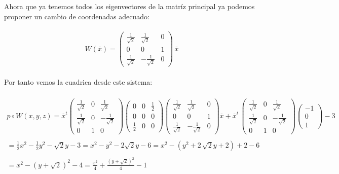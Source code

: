 \documentclass[11pt,letterpaper]{article}
\begin{document}
    Ahora que ya tenemos todos los eigenvectores de la matr\'iz principal ya podemos proponer un cambio de coordenadas adecuado:\,\\
    \,\\
    \begin{equation*}
        W(\overline{x})=
        \begin{pmatrix}
                \frac{1}{\sqrt{2}} & \frac{1}{\sqrt{2}} & 0\\
                0 & 0& 1\\
                 \frac{1}{\sqrt{2}} & -\frac{1}{\sqrt{2}} &0
                \end{pmatrix}\,\overline{x}
    \end{equation*}\,\\
    Por tanto vemos la cuadrica desde este sistema:\,\\
    \,\\
    \begin{align*}
        p\circ W(x,y,z)=\overline{x}^t \begin{pmatrix}
                \frac{1}{\sqrt{2}} & 0& \frac{1}{\sqrt{2}}\\
                \frac{1}{\sqrt{2}} & 0& -\frac{1}{\sqrt{2}}\\
                 0& 1 &0
                \end{pmatrix}
                \begin{pmatrix}
                0 & 0 & \frac{1}{2}\\
                0 & 0 & 0\\
                \frac{1}{2} & 0 & 0
                \end{pmatrix}
                \begin{pmatrix}
                \frac{1}{\sqrt{2}} & \frac{1}{\sqrt{2}} & 0\\
                0 & 0& 1\\
                 \frac{1}{\sqrt{2}} & -\frac{1}{\sqrt{2}} &0
                \end{pmatrix}\overline{x}+\overline{x}^t\,\begin{pmatrix}
                \frac{1}{\sqrt{2}} & 0& \frac{1}{\sqrt{2}}\\
                \frac{1}{\sqrt{2}} & 0& -\frac{1}{\sqrt{2}}\\
                 0& 1 &0
                \end{pmatrix}
                \begin{pmatrix}
                -1 \\
                0\\
                1
                \end{pmatrix}-3\,\\
                \,\\
                =\frac{1}{2}x^2-\frac{1}{2}y^2-\sqrt{2}y-3=x^2-y^2-2\sqrt{2}y-6=x^2-(y^2+2\,\sqrt{2}y+2)+2-6\,\\
                \,\\
                =x^2-(y+\sqrt{2})^2-4=\frac{x^2}{4}+\frac{(y+\sqrt{2})^2}{4}-1
    \end{align*}\,\\
\end{document}
